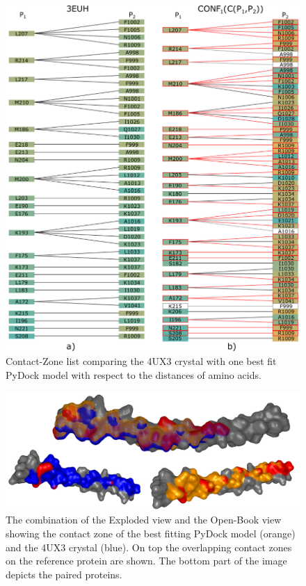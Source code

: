 \documentclass{bmcart}
\def\OpBook {Open-Book view\xspace}
\def\ExpView {Exploded view\xspace}
\def\CoZoList{Contact-Zone list\xspace}
\begin{document}
\begin{backmatter}
\begin{figure}[h!]
    \centering
  \includegraphics[width=0.9\columnwidth]{images/figure13.pdf}
    \caption{ \CoZoList comparing the 4UX3 crystal with one best fit PyDock model with respect to the distances of amino acids.}
  \label{fig:coiled2}
\end{figure}

\begin{figure}[!h]
  \centering
  \includegraphics[width=0.9\columnwidth]{images/figure14.png}
  \caption{ The combination of the \ExpView and the \OpBook showing the contact zone of the best fitting PyDock model (orange) and the 4UX3 crystal (blue). On top the overlapping contact zones on the reference protein are shown. The bottom part of the image depicts the paired proteins.}
  \label{fig:selection_4_final_SMC3_PyDock}
\end{figure}


\end{backmatter}
\end{document}
